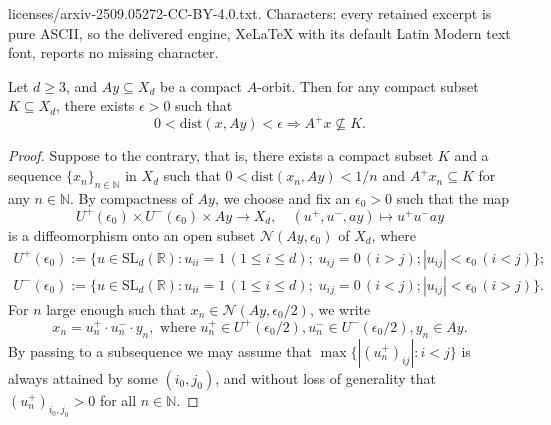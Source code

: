 \documentclass[10pt,a4paper]{amsart}
\newcommand{\NN}{\mathbb{N}}
\newcommand{\RR}{\mathbb{R}}
\newcommand{\SL}{\mathrm{SL}}
\newcommand{\cN}{\mathcal{N}}
\newcommand{\dist}{\mathrm{dist}}
\begin{document}
licenses/arxiv-2509.05272-CC-BY-4.0.txt. Characters: every retained excerpt is pure ASCII, so the delivered engine, XeLaTeX with its default Latin Modern text font, reports no missing character.
\begin{lemma}\label{L:Isolation} Let $d\geq 3$, and $Ay\subseteq X_d$ be a compact $A$-orbit. Then for any compact subset $K\subseteq X_d$, there exists $\epsilon>0$ such that  \begin{equation*}
		0<\dist(x,Ay)<\epsilon\Longrightarrow A^+x\not\subseteq K.
	\end{equation*}
\end{lemma}

\begin{proof}
	Suppose to the contrary, that is, there exists a compact subset $K$ and a sequence $\{x_n\}_{n\in\NN}$ in $X_d$ such that $0<\dist(x_n,Ay)<1/n$ and $A^+x_n\subseteq K$ for any $n\in\NN$. By compactness of $Ay$, we choose and fix an $\epsilon_0>0$ such that the map \begin{equation*}
		U^{+}(\epsilon_0)\times U^-(\epsilon_0)\times Ay\to X_d,\quad (u^+,u^-,ay)\mapsto u^+u^-ay
	\end{equation*}
	is a diffeomorphism onto an open subset $\cN(Ay,\epsilon_0)$ of $X_d$, where 
	\begin{equation*}
		\begin{aligned}
			U^+(\epsilon_0):=\{u\in \SL_d(\RR): u_{ii}=1\,(1\leq i\leq d);\;u_{ij}=0\,(i>j); |u_{ij}|<\epsilon_0\,(i<j)\};\\
			U^-(\epsilon_0):=\{u\in \SL_d(\RR): u_{ii}=1\,(1\leq i\leq d);\;u_{ij}=0\,(i<j); |u_{ij}|<\epsilon_0\,(i>j)\}.
		\end{aligned}
	\end{equation*}
	For $n$ large enough such that $x_n\in \cN(Ay,\epsilon_0/2)$, we write \begin{equation*}
		x_n=u^+_n\cdot u^-_n\cdot y_n, \text{ where }u^+_n\in U^+(\epsilon_0/2), u^-_n\in U^-(\epsilon_0/2), y_n\in Ay.
	\end{equation*}
	By passing to a subsequence we may assume that $\max\{|(u^+_n)_{ij}|:i<j\}$ is always attained by some $(i_0,j_0)$, and without loss of generality that $(u^+_n)_{i_0,j_0}>0$ for all $n\in\NN$. 
	

\end{proof}
\end{document}

